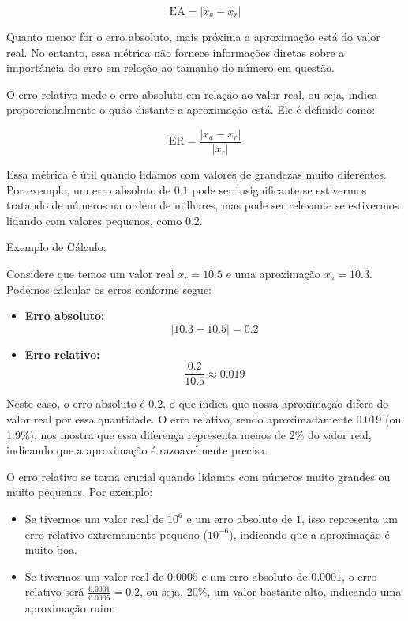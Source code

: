 \[
\text{EA} = |x_a - x_r|
\]

Quanto menor for o erro absoluto, mais próxima a aproximação está do valor real. No entanto, essa métrica não fornece informações diretas sobre a importância do erro em relação ao tamanho do número em questão.  

O erro relativo mede o erro absoluto em relação ao valor real, ou seja, indica proporcionalmente o quão distante a aproximação está. Ele é definido como:

\[
\text{ER} = \frac{|x_a - x_r|}{|x_r|}
\]

Essa métrica é útil quando lidamos com valores de grandezas muito diferentes. Por exemplo, um erro absoluto de \( 0.1 \) pode ser insignificante se estivermos tratando de números na ordem de milhares, mas pode ser relevante se estivermos lidando com valores pequenos, como 0.2.  

{Exemplo de Cálculo:} \begin {ex} Considere que temos um valor real \( x_r = 10.5 \) e uma aproximação \( x_a = 10.3 \). Podemos calcular os erros conforme segue:

\begin{itemize}
    \item \textbf{Erro absoluto:}  
    \[
    |10.3 - 10.5| = 0.2
    \]
    \item \textbf{Erro relativo:}  
    \[
    \frac{0.2}{10.5} \approx 0.019
    \]
\end{itemize}

Neste caso, o erro absoluto é \( 0.2 \), o que indica que nossa aproximação difere do valor real por essa quantidade. O erro relativo, sendo aproximadamente \( 0.019 \) (ou 1.9\%), nos mostra que essa diferença representa menos de 2\% do valor real, indicando que a aproximação é razoavelmente precisa.
\end {ex}

O erro relativo se torna crucial quando lidamos com números muito grandes ou muito pequenos. Por exemplo:

\begin{itemize}
    \item Se tivermos um valor real de \( 10^6 \) e um erro absoluto de \( 1 \), isso representa um erro relativo extremamente pequeno (\( 10^{-6} \)), indicando que a aproximação é muito boa.
    \item Se tivermos um valor real de \( 0.0005 \) e um erro absoluto de \( 0.0001 \), o erro relativo será \(\frac{0.0001}{0.0005} = 0.2\), ou seja, 20\%, um valor bastante alto, indicando uma aproximação ruim.
\end{itemize}

